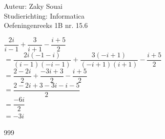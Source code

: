 \documentclass[a4paper]{article}
\begin{document}
  
\noindent \large Auteur: Zaky Souai \\
\noindent \large Studierichting:  Informatica\\
\noindent \large Oefeningenreeks 1B nr. 15.6\\

\bigskip

\normalsize

$\dfrac{2i}{i - 1} + \dfrac{3}{i + 1} - \dfrac{i + 5}{2} $ \\

$= \dfrac{2i (-1 - i)}{(i - 1)(-i - 1)} +\dfrac{3(-i + 1)}{(-i + 1)(i + 1)} - \dfrac{i + 5}{2} $ \\

$= \dfrac{2 - 2i}{2} + \dfrac{-3i + 3}{2} - \dfrac{i + 5}{2}$ \\

$= \dfrac{2 - 2i + 3 - 3i - i - 5}{2}$ \\

$= \dfrac{-6i}{2}$ \\

$= -3i$





\begin{thebibliography}{999}
\end{thebibliography}
\end{document}

